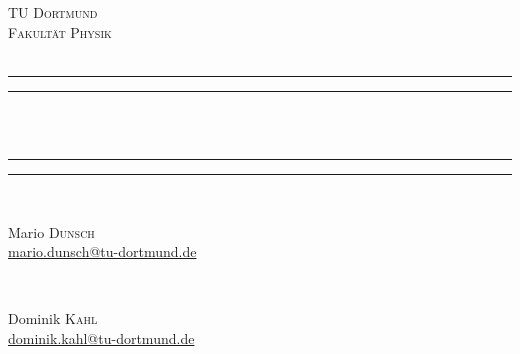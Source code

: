 \begin{titlepage}

\center


\textsc{\LARGE TU Dortmund}\\[1.5cm]
\textsc{\Large Fakultät Physik}\\[0.5cm]
\textsc{\large \ver}\\[0.5cm]

\rule{\textwidth}{1.6pt}\vspace*{-\baselineskip}\vspace*{2pt}
\rule{\textwidth}{0.4pt}\\[\baselineskip]

{ \huge \bfseries \tit}\\[0.2cm]

\rule{\textwidth}{0.4pt}\vspace*{-\baselineskip}\vspace{3.2pt}
\rule{\textwidth}{1.6pt}\\[\baselineskip]


\begin{minipage}{0.4\textwidth}
\begin{flushleft} \large
Mario \textsc{Dunsch}\\
\small \href{mario.dunsch@tu-dortmund.de}{mario.dunsch@tu-dortmund.de}
\end{flushleft}
\end{minipage}
~
\begin{minipage}{0.4\textwidth}
\begin{flushright} \large
Dominik \textsc{Kahl}\\
\small \href{dominik.kahl@tu-dortmund.de}{dominik.kahl@tu-dortmund.de}
\end{flushright}
\end{minipage}\\[1cm]


{\large \thedate}\\[3cm]

\vfill

\end{titlepage}

